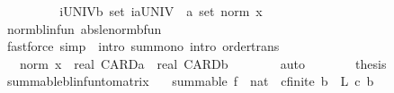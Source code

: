 \begin{isabellebody}
\ \ \ \ \isamarkupfalse%
\ \isamarkupfalse%
\ {\isachardoublequoteopen}{\isasymdots}\ {\isasymle}\ {\isacharparenleft}{\kern0pt}{\isasymSum}i{\isasymin}{\isacharparenleft}{\kern0pt}UNIV{\isacharcolon}{\kern0pt}{\isacharcolon}{\kern0pt}{\isacharprime}{\kern0pt}b\ set{\isacharparenright}{\kern0pt}{\isachardot}{\kern0pt}\ {\isasymSum}ia{\isasymin}{\isacharparenleft}{\kern0pt}UNIV\ {\isacharcolon}{\kern0pt}{\isacharcolon}{\kern0pt}\ {\isacharprime}{\kern0pt}a\ set{\isacharparenright}{\kern0pt}{\isachardot}{\kern0pt}\ norm\ x{\isacharparenright}{\kern0pt}{\isachardoublequoteclose}\isanewline
\ \ \ \ \ \ \isamarkupfalse%
\ norm{\isacharunderscore}{\kern0pt}blinfun\ abs{\isacharunderscore}{\kern0pt}le{\isacharunderscore}{\kern0pt}norm{\isacharunderscore}{\kern0pt}bfun\isanewline
\ \ \ \ \ \ \isamarkupfalse%
\ {\isacharparenleft}{\kern0pt}fastforce\ simp{\isacharcolon}{\kern0pt}\ {\isacharasterisk}{\kern0pt}{\isacharasterisk}{\kern0pt}\ intro{\isacharbang}{\kern0pt}{\isacharcolon}{\kern0pt}\ sum{\isacharunderscore}{\kern0pt}mono\ intro{\isacharcolon}{\kern0pt}\ order{\isachardot}{\kern0pt}trans{\isacharparenright}{\kern0pt}\isanewline
\ \ \ \ \isamarkupfalse%
\ \isamarkupfalse%
\ {\isachardoublequoteopen}{\isasymdots}\ {\isacharequal}{\kern0pt}\ norm\ x\ {\isacharasterisk}{\kern0pt}\ {\isacharparenleft}{\kern0pt}real\ CARD{\isacharparenleft}{\kern0pt}{\isacharprime}{\kern0pt}a{\isacharparenright}{\kern0pt}\ {\isacharasterisk}{\kern0pt}\ real\ CARD{\isacharparenleft}{\kern0pt}{\isacharprime}{\kern0pt}b{\isacharparenright}{\kern0pt}{\isacharparenright}{\kern0pt}{\isachardoublequoteclose}\isanewline
\ \ \ \ \ \ \isamarkupfalse%
\ auto\isanewline
\ \ \ \ \isamarkupfalse%
\ \isamarkupfalse%
\ {\isacharquery}{\kern0pt}thesis\isacommand{{\isachardot}{\kern0pt}}\isamarkupfalse%
\isanewline
\ \ \isamarkupfalse%
\isanewline
{}\isamarkupfalse%
%
\endisatagproof
{\isafoldproof}%
%
\isadelimproof
\isanewline
%
\endisadelimproof
\isanewline
{}\isamarkupfalse%
\ summable{\isacharunderscore}{\kern0pt}blinfun{\isacharunderscore}{\kern0pt}to{\isacharunderscore}{\kern0pt}matrix{\isacharcolon}{\kern0pt}\isanewline
\ \ \ {\isachardoublequoteopen}summable\ {\isacharparenleft}{\kern0pt}f\ {\isacharcolon}{\kern0pt}{\isacharcolon}{\kern0pt}\ nat\ {\isasymRightarrow}\ {\isacharparenleft}{\kern0pt}{\isacharprime}{\kern0pt}c{\isacharcolon}{\kern0pt}{\isacharcolon}{\kern0pt}finite\ {\isasymRightarrow}\isactrlsub b\ {\isacharunderscore}{\kern0pt}{\isacharparenright}{\kern0pt}\ {\isasymRightarrow}\isactrlsub L\ {\isacharparenleft}{\kern0pt}{\isacharprime}{\kern0pt}c\ {\isasymRightarrow}\isactrlsub b\ {\isacharunderscore}{\kern0pt}{\isacharparenright}{\kern0pt}{\isacharparenright}{\kern0pt}{\isachardoublequoteclose}\isanewline

\end{isabellebody}
